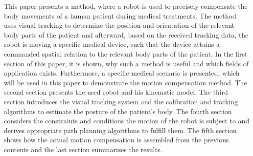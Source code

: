 This paper presents a method, where a robot is used to precisely compensate the body movements of a human patient during medical treatments. The method uses visual tracking to determine the position and orientation of the relevant body parts of the patient and afterward, based on the received tracking data, the robot is  moving a specific medical device, such that the device attains a commanded spatial relation to the relevant body parts of the patient. In the 
first section of this paper, it is shown, why such a method is useful and which fields of application exists. Furthermore, a specific medical scenario is presented, which will be used in this paper to demonstrate the motion compensation method. The second section presents the 
used robot and his kinematic model. The third section introduces the visual tracking system and the calibration and tracking algorithms to estimate the posture of the patient's body. The 
fourth section considers the constraints and conditions the motion of the robot is subject to and derives appropriate path planning algorithms to fulfill them. The fifth section shows how the actual motion compensation is assembled from the previous contents and the last section summarizes the results.